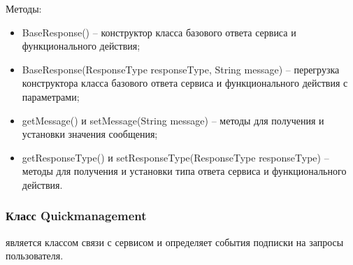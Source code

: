 Методы:
\begin{itemize}
  \item BaseResponse() – конструктор класса базового ответа сервиса и функционального действия;
  \item BaseResponse(ResponseType responseType, String message) – перегрузка конструктора класса базового ответа сервиса и функционального действия с параметрами;
  \item getMessage() и setMessage(String message) – методы для получения и установки значения сообщения;
  \item getResponseType() и setResponseType(ResponseType responseType) – методы для получения и установки типа ответа сервиса и функционального действия.
\end{itemize}

\subsubsection{Класс Quickmanagement }
\label{sub:arch_and_mod:application_server_layer:quickmanagement}

является классом связи с сервисом и определяет события подписки на запросы пользователя.


